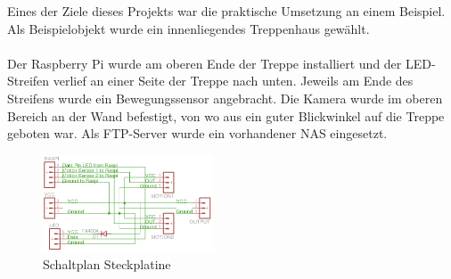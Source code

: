 Eines der Ziele dieses Projekts war die praktische Umsetzung an einem Beispiel. Als Beispielobjekt wurde ein innenliegendes Treppenhaus gewählt. \\\\
Der Raspberry Pi wurde am oberen Ende der Treppe installiert und der LED-Streifen verlief an einer Seite der Treppe nach unten. Jeweils am Ende des Streifens wurde ein Bewegungssensor angebracht. Die Kamera wurde im oberen Bereich an der Wand befestigt, von wo aus ein guter Blickwinkel auf die Treppe geboten war. Als FTP-Server wurde ein vorhandener NAS eingesetzt.\\

\begin{figure}
	\vspace{-20pt}
	\begin{center}
		\includegraphics[width=0.45\textwidth]{./data/eagle.png}
	\end{center}
	\vspace{-20pt}
	\caption{\label{fig:image-eagle}Schaltplan Steckplatine}
	\vspace{+10pt}
\end{figure} 


